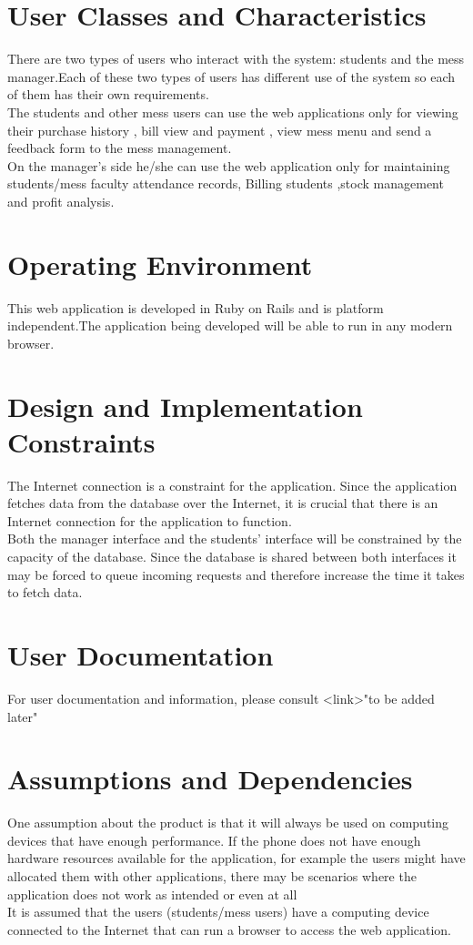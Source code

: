 \documentclass{scrreprt}
\begin{document}
\section{User Classes and Characteristics}
There are two types of users who interact with the system: students and the mess manager.Each of these two types of users has different use of the system so each of them has their own requirements.\\
The students and other mess users can use the web applications only for viewing their purchase history , bill view and payment , view mess menu and send a feedback form to the mess management.\\
On the manager’s side he/she can use the web application only for maintaining students/mess faculty attendance records, Billing students ,stock management and profit analysis.\\

\section{Operating Environment}
This web application is developed in Ruby on Rails and is platform independent.The application being developed will be able to run in any modern browser.

\section{Design and Implementation Constraints}
The Internet connection is a constraint for the application. Since the application fetches data from the 
database over the Internet, it is crucial that there is an Internet connection for the application to function. \\

Both the manager interface and the students' interface  will be constrained by the capacity of the database. Since 
the database is shared between both interfaces it may be forced to queue incoming requests and therefore 
increase the time it takes to fetch data.



\section{User Documentation}
For  user  documentation  and  information,  please  consult  <link>"to be added later"
\section{Assumptions and Dependencies}
One assumption about the product is that it will always be used on computing devices that have
enough performance. If the phone does not have enough hardware resources available for the application, for 
example the users might have allocated them with other applications, there may be scenarios where the 
application does not work as intended or even at all\\
It is assumed that the users (students/mess users) have a computing device connected to the Internet that can run a browser to access the web application.
\end{document}

